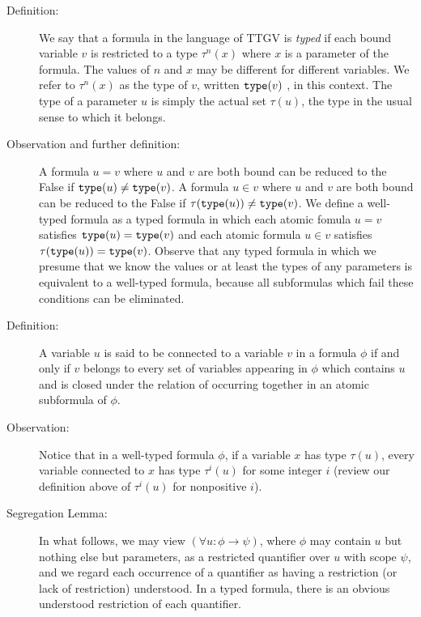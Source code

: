 \documentclass[12pt]{article}
\begin{document}
\begin{description}

\item[Definition:]  We say that a formula in the language of TTGV is {\em typed\/} if each bound variable $v$ is restricted to a type $\tau^n(x)$ where $x$ is a parameter of the formula.  The values of $n$ and $x$ may be different for different variables.  We refer to $\tau^n(x)$ as the type of $v$, written ${\tt type}(v)$ , in this context.  The type of a parameter $u$ is simply the actual set $\tau(u)$, the type in the usual sense to which it belongs.

\item[Observation and further definition:]  A formula $u=v$ where $u$ and $v$ are both bound can be reduced to the False if ${\tt type}(u) \neq {\tt type}(v)$.  A formula $u \in v$ where $u$ and $v$ are both bound can be reduced to the False if $\tau({\tt type}(u)) \neq {\tt type}(v)$.   We define a well-typed formula as a typed formula in which
each atomic fomula $u=v$ satisfies ${\tt type}(u) = {\tt type}(v)$ and each atomic formula $u \in v$ satisfies $\tau({\tt type}(u)) = {\tt type}(v)$.  Observe that any typed formula in which we presume that we know the values or at least the types of any parameters is equivalent to a well-typed formula, because all subformulas which fail these conditions can be eliminated.

\item[Definition:]  A variable $u$ is said to be connected to a variable $v$ in a formula $\phi$ if and only if $v$ belongs to every set of variables appearing in $\phi$ which contains $u$ and is closed under the relation of occurring together in an atomic subformula of $\phi$. 

\item[Observation:]  Notice that in a well-typed formula $\phi$, if a variable $x$ has type $\tau(u)$, every variable connected to $x$ has type $\tau^i(u)$ for some integer $i$ (review our definition above of $\tau^i(u)$ for nonpositive $i$).

\item[Segregation Lemma:]  
In what follows, we may view $(\forall u:\phi \rightarrow \psi)$, where $\phi$ may contain $u$ but nothing else but parameters, as a restricted quantifier over $u$ with scope $\psi$, and we regard each occurrence of a quantifier as having a restriction (or lack of restriction) understood.  In a typed formula, there is an obvious understood restriction of each quantifier.


\end{description}
\end{document}
